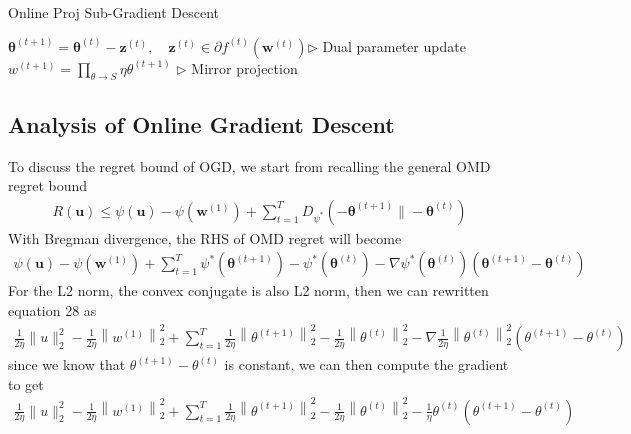 \documentclass[11pt]{article}
\begin{document}
\begin{algorithm}[H]
\caption{Online Proj Sub-Gradient Descent}
\label{algo:osgd}
\begin{algorithmic}[1]
\STATE $\boldsymbol{\theta}^{(t+1)}=\boldsymbol{\theta}^{(t)}-\boldsymbol{z}^{(t)}, \quad \boldsymbol{z}^{(t)} \in \partial f^{(t)}\left(\boldsymbol{w}^{(t)}\right)$\hfill $\triangleright$ Dual parameter update
\STATE $w^{(t+1)}=\prod_{\theta \rightarrow S} \eta \theta^{(t+1)}$ \hfill $\triangleright$ Mirror projection 
\ENDFOR
\end{algorithmic}
\end{algorithm}
\subsection{Analysis of Online Gradient Descent}
To discuss the regret bound of OGD, we start from recalling the general OMD regret bound 
\begin{align}
    R(\boldsymbol{u}) \leq \psi(\boldsymbol{u})-\psi\left(\boldsymbol{w}^{(1)}\right)+\sum_{t=1}^{T} D_{\psi^{*}}\left(-\boldsymbol{\theta}^{(t + 1)} \|-\boldsymbol{\theta}^{(t)}\right)
\end{align}
With Bregman divergence, the RHS of OMD regret will become
\begin{align}
   \psi(\boldsymbol{u})-\psi\left(\boldsymbol{w}^{(1)}\right)+\sum_{t=1}^{T} \psi^{*}\left(\boldsymbol{\theta}^{(t+1)}\right)-\psi^{*}\left(\boldsymbol{\theta}^{(t)}\right)-\nabla \psi^{*}\left(\boldsymbol{\theta}^{(t)}\right)\left(\boldsymbol{\theta}^{(t+1)}-\boldsymbol{\theta}^{(t)}\right)
\end{align}
For the L2 norm, the convex conjugate is also L2 norm, then we can rewritten equation 28 as 
\begin{align}
    \frac{1}{2 \eta}\|u\|_{2}^{2}-\frac{1}{2 \eta}\left\|w^{(1)}\right\|_{2}^{2}+\sum_{t=1}^{T} \frac{1}{2 \eta}\left\|\theta^{(t+1)}\right\|_{2}^{2}-\frac{1}{2 \eta}\left\|\theta^{(t)}\right\|_{2}^{2}-\nabla \frac{1}{2 \eta}\left\|\theta^{(t)}\right\|_{2}^{2}\left(\theta^{(t+1)}-\theta^{(t)}\right)
\end{align}
since we know that $\theta^{(t+1)} - \theta^{(t)}$ is constant, we can then compute the gradient to get 
\begin{align}
    \frac{1}{2 \eta}\|u\|_{2}^{2}-\frac{1}{2 \eta}\left\|w^{(1)}\right\|_{2}^{2}+\sum_{t=1}^{T} \frac{1}{2 \eta}\left\|\theta^{(t+1)}\right\|_{2}^{2}-\frac{1}{2 \eta}\left\|\theta^{(t)}\right\|_{2}^{2}-\frac{1}{ \eta}\theta^{(t)}\left(\theta^{(t+1)}-\theta^{(t)}\right)
\end{align}
\end{document}
